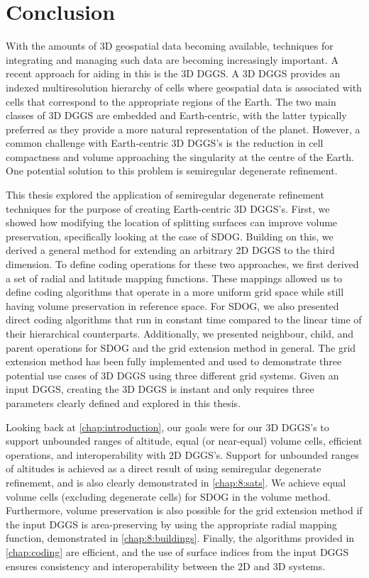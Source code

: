 \chapter{Conclusion} \label{chap:conclusion}
With the amounts of 3D geospatial data becoming available, techniques for integrating and managing such data are becoming increasingly important.
A recent approach for aiding in this is the 3D DGGS.
A 3D DGGS provides an indexed multiresolution hierarchy of cells where geospatial data is associated with cells that correspond to the appropriate regions of the Earth.
The two main classes of 3D DGGS are embedded and Earth-centric, with the latter typically preferred as they provide a more natural representation of the planet.
However, a common challenge with Earth-centric 3D DGGS's is the reduction in cell compactness and volume approaching the singularity at the centre of the Earth.
One potential solution to this problem is semiregular degenerate refinement.


This thesis explored the application of semiregular degenerate refinement techniques for the purpose of creating Earth-centric 3D DGGS's.
First, we showed how modifying the location of splitting surfaces can improve volume preservation, specifically looking at the case of SDOG.
Building on this, we derived a general method for extending an arbitrary 2D DGGS to the third dimension.
To define coding operations for these two approaches, we first derived a set of radial and latitude mapping functions.
These mappings allowed us to define coding algorithms that operate in a more uniform grid space while still having volume preservation in reference space.
For SDOG, we also presented direct coding algorithms that run in constant time compared to the linear time of their hierarchical counterparts.
Additionally, we presented neighbour, child, and parent operations for SDOG and the grid extension method in general.
The grid extension method has been fully implemented and used to demonstrate three potential use cases of 3D DGGS using three different grid systems.
Given an input DGGS, creating the 3D DGGS is instant and only requires three parameters clearly defined and explored in this thesis.


Looking back at \cref{chap:introduction}, our goals were for our 3D DGGS's to support unbounded ranges of altitude, equal (or near-equal) volume cells, efficient operations, and interoperability with 2D DGGS's.
Support for unbounded ranges of altitudes is achieved as a direct result of using semiregular degenerate refinement, and is also clearly demonstrated in \cref{chap:8:sats}.
We achieve equal volume cells (excluding degenerate cells) for SDOG in the volume method.
Furthermore, volume preservation is also possible for the grid extension method if the input DGGS is area-preserving by using the appropriate radial mapping function, demonstrated in \cref{chap:8:buildings}.
Finally, the algorithms provided in \cref{chap:coding} are efficient, and the use of surface indices from the input DGGS ensures consistency and interoperability between the 2D and 3D systems.


